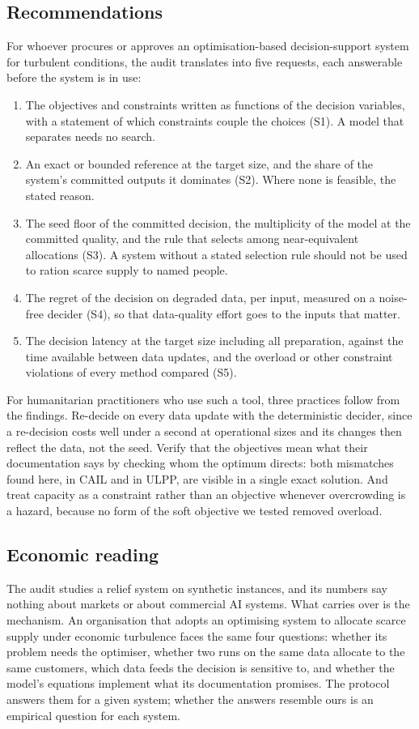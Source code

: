 \documentclass[systems,article,submit,moreauthors,pdftex]{Definitions/mdpi}
\begin{document}
\subsection{Recommendations}\label{sec:recommendations}
For whoever procures or approves an optimisation-based decision-support system for turbulent
conditions, the audit translates into five requests, each answerable before the system is in use:
\begin{enumerate}
\item The objectives and constraints written as functions of the decision variables, with a
statement of which constraints couple the choices (S1). A model that separates needs no search.
\item An exact or bounded reference at the target size, and the share of the system's committed
outputs it dominates (S2). Where none is feasible, the stated reason.
\item The seed floor of the committed decision, the multiplicity of the model at the committed
quality, and the rule that selects among near-equivalent allocations (S3). A system without a
stated selection rule should not be used to ration scarce supply to named people.
\item The regret of the decision on degraded data, per input, measured on a noise-free decider
(S4), so that data-quality effort goes to the inputs that matter.
\item The decision latency at the target size including all preparation, against the time
available between data updates, and the overload or other constraint violations of every
method compared (S5).
\end{enumerate}
For humanitarian practitioners who use such a tool, three practices follow from the findings.
Re-decide on every data update with the deterministic decider, since a re-decision costs well
under a second at operational sizes and its changes then reflect the data, not the seed. Verify
that the objectives mean what their documentation says by checking whom the optimum directs:
both mismatches found here, in CAIL and in ULPP, are visible in a single exact solution. And
treat capacity as a constraint rather than an objective whenever overcrowding is a hazard,
because no form of the soft objective we tested removed overload.

\subsection{Economic reading}
The audit studies a relief system on synthetic instances, and its numbers say nothing about
markets or about commercial AI systems. What carries over is the mechanism. An organisation that
adopts an optimising system to allocate scarce supply under economic turbulence faces the same
four questions: whether its problem needs the optimiser, whether two runs on the same data
allocate to the same customers, which data feeds the decision is sensitive to, and whether the
model's equations implement what its documentation promises. The protocol answers them for a given
system; whether the answers resemble ours is an empirical question for each system.
\end{document}
